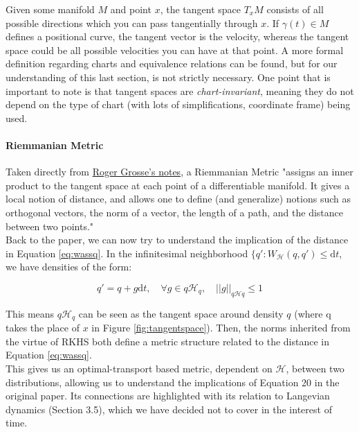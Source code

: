 \documentclass[12pt]{article}
\begin{document}
\noindent Given some manifold $M$ and point $x$, the tangent space $T_xM$ consists of all possible directions which you can pass tangentially through $x$. If $\gamma(t) \in M$ defines a positional curve, the tangent vector is the velocity, whereas the tangent space could be all possible velocities you can have at that point. A more formal definition regarding charts and equivalence relations can be found, but for our understanding of this last section, is not strictly necessary. One point that is important to note is that tangent spaces are \textit{chart-invariant}, meaning they do not depend on the type of chart (with lots of simplifications, coordinate frame) being used.

\paragraph{Riemmanian Metric} Taken directly from \href{https://metacademy.org/graphs/concepts/riemannian_metrics}{Roger Grosse's notes}, a Riemmanian Metric "assigns an inner product to the tangent space at each point of a differentiable manifold. It gives a local notion of distance, and allows one to define (and generalize) notions such as orthogonal vectors, the norm of a vector, the length of a path, and the distance between two points."\\

\noindent Back to the paper, we can now try to understand the implication of the distance in Equation \ref{eq:wassq}. In the infinitesimal neighborhood $\{ q': W_\mathcal{H}(q, q') \leq \text{d}t$, we have densities of the form:

\begin{equation}
    q' = q + g\text{d}t, \quad \forall g \in q\mathcal{H}_q, \quad ||g||_{q \mathcal{H}q} \leq 1
\end{equation}

\noindent This means $q\mathcal{H}_q$ can be seen as the tangent space around density $q$ (where q takes the place of $x$ in Figure \ref{fig:tangentspace}). Then, the norms inherited from the virtue of RKHS both define a metric structure related to the distance in Equation \ref{eq:wassq}. \\

\noindent This gives us an optimal-transport based metric, dependent on $\mathcal{H}$, between two distributions, allowing us to understand the implications of Equation 20 in the original paper. Its connections are highlighted with its relation to Langevian dynamics (Section 3.5), which we have decided not to cover in the interest of time. \\
\end{document}
